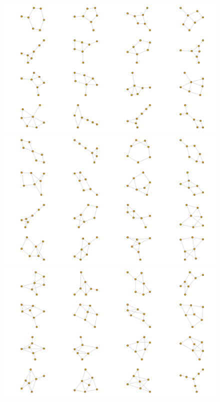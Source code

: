 \begin{figure}[h!]
	\subfloat
    {\includegraphics[width=0.95\linewidth]{atlas/atlas7-2.png}} \\
    \subfloat
    {\includegraphics[width=0.95\linewidth]{atlas/atlas7-3.png}} \\
	\subfloat
    {\includegraphics[width=0.95\linewidth]{atlas/atlas7-4.png}} 
\end{figure}

